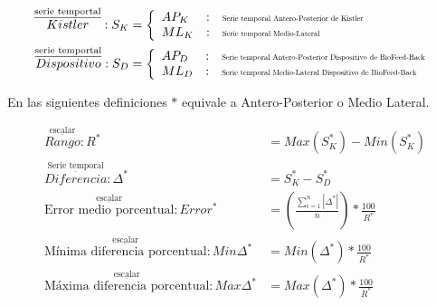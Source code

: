 \documentclass[12pt,a4paper]{article}
\newcommand{\nombreDispositivo}{Dispositivo de BioFeed-Back }
\begin{document}
\begin{tcolorbox}[colframe=black,title=Definición de ecuaciones,center title]	
	
	\begin{align}
	\overset{\underline{\textrm{serie temportal}}}{Kistler}:S_{K} &= \left\lbrace \begin{array}{lcl}
	AP_{K} & : & \scalebox{0.6}{\textrm{Serie temporal Antero-Posterior de Kistler}}\\
	ML_{K} & : & \scalebox{0.6}{\textrm{Serie temporal Medio-Lateral}}\\
	\end{array} \right. \label{eq:seriesKistler} \\
	\overset{\underline{\textrm{serie temportal}}}{Dispositivo}:S_{D} &= \left\lbrace \begin{array}{lcl}
	AP_{D} & : & \scalebox{0.6}{\textrm{Serie temporal Antero-Posterior \nombreDispositivo}}\\
	ML_{D} & : & \scalebox{0.6}{\textrm{Serie temporal Medio-Lateral \nombreDispositivo}}
	\end{array} \right. \label{eq:seriesDisposito}
	\end{align}
	
	En las siguientes definiciones $*$ equivale a Antero-Posterior o Medio Lateral.
	
	\begin{align} 
	\overset{\underline{\textrm{escalar}}}{Rango}:	R^{*}&=Max(S_{K}^{*})-Min(S_{K}^{*})\\
	\overset{\underline{\textrm{Serie temporal}}}{Diferencia}:	\Delta^{*}&=S_{K}^{*}-S_{D}^{*}\\
	\overset{\underline{\textrm{escalar}}}{\textrm{Error medio porcentual}}:	Error^{*}&=\left( \frac{\sum\limits_{i=1}^{n}|\Delta^{*}|}{n} \right)*\frac{100}{R^{*}} \\
	\overset{\underline{\textrm{escalar}}}{\textrm{Mínima diferencia porcentual}}:	Min\Delta^{*}&=Min(\Delta^{*})*\frac{100}{R^{*}}\\
	\overset{\underline{\textrm{escalar}}}{\textrm{Máxima diferencia porcentual}}:	Max\Delta^{*}&=Max(\Delta^{*})*\frac{100}{R^{*}}
	\end{align}	
\end{tcolorbox}
\end{document}
